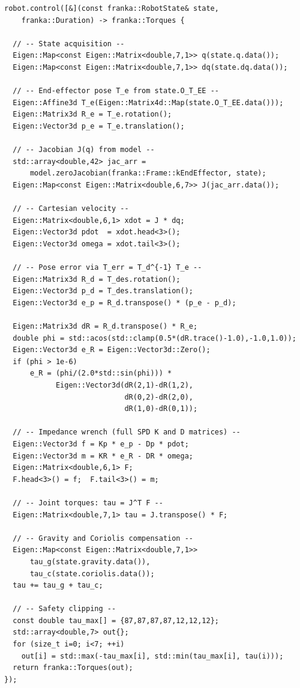 \begin{lstlisting}[style=cppstyle,
  caption={Complete Cartesian impedance control callback},
  label={lst:full_ctrl}]
robot.control([&](const franka::RobotState& state,
    franka::Duration) -> franka::Torques {

  // -- State acquisition --
  Eigen::Map<const Eigen::Matrix<double,7,1>> q(state.q.data());
  Eigen::Map<const Eigen::Matrix<double,7,1>> dq(state.dq.data());

  // -- End-effector pose T_e from state.O_T_EE --
  Eigen::Affine3d T_e(Eigen::Matrix4d::Map(state.O_T_EE.data()));
  Eigen::Matrix3d R_e = T_e.rotation();
  Eigen::Vector3d p_e = T_e.translation();

  // -- Jacobian J(q) from model --
  std::array<double,42> jac_arr =
      model.zeroJacobian(franka::Frame::kEndEffector, state);
  Eigen::Map<const Eigen::Matrix<double,6,7>> J(jac_arr.data());

  // -- Cartesian velocity --
  Eigen::Matrix<double,6,1> xdot = J * dq;
  Eigen::Vector3d pdot  = xdot.head<3>();
  Eigen::Vector3d omega = xdot.tail<3>();

  // -- Pose error via T_err = T_d^{-1} T_e --
  Eigen::Matrix3d R_d = T_des.rotation();
  Eigen::Vector3d p_d = T_des.translation();
  Eigen::Vector3d e_p = R_d.transpose() * (p_e - p_d);

  Eigen::Matrix3d dR = R_d.transpose() * R_e;
  double phi = std::acos(std::clamp(0.5*(dR.trace()-1.0),-1.0,1.0));
  Eigen::Vector3d e_R = Eigen::Vector3d::Zero();
  if (phi > 1e-6)
      e_R = (phi/(2.0*std::sin(phi))) *
            Eigen::Vector3d(dR(2,1)-dR(1,2),
                            dR(0,2)-dR(2,0),
                            dR(1,0)-dR(0,1));

  // -- Impedance wrench (full SPD K and D matrices) --
  Eigen::Vector3d f = Kp * e_p - Dp * pdot;
  Eigen::Vector3d m = KR * e_R - DR * omega;
  Eigen::Matrix<double,6,1> F;
  F.head<3>() = f;  F.tail<3>() = m;

  // -- Joint torques: tau = J^T F --
  Eigen::Matrix<double,7,1> tau = J.transpose() * F;

  // -- Gravity and Coriolis compensation --
  Eigen::Map<const Eigen::Matrix<double,7,1>>
      tau_g(state.gravity.data()),
      tau_c(state.coriolis.data());
  tau += tau_g + tau_c;

  // -- Safety clipping --
  const double tau_max[] = {87,87,87,87,12,12,12};
  std::array<double,7> out{};
  for (size_t i=0; i<7; ++i)
    out[i] = std::max(-tau_max[i], std::min(tau_max[i], tau(i)));
  return franka::Torques(out);
});
\end{lstlisting}


